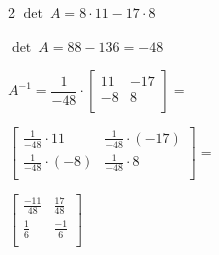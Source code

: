 \documentclass[12pt]{article}
\begin{document}
\begin{multicols}{2}
$\det~ A = 8 \cdot 11-17 \cdot 8$

$\det~ A =88-136=-48$
\vspace{0.3cm}

$A^{-1} =\dfrac{1}{-48}\cdot \begin{bmatrix}11&-17\\-8&8\\\end{bmatrix}=$
\vspace{0.3cm}

$\begin{bmatrix}\frac{1}{-48} \cdot 11&\frac{1}{-48} \cdot (-17)\\\frac{1}{-48} \cdot (-8)&\frac{1}{-48} \cdot 8\\\end{bmatrix}=$
\vspace{0.3cm}

$\begin{bmatrix}\frac{-11}{48}&\frac{17}{48}\\\frac{1}{6}&\frac{-1}{6}\\\end{bmatrix}$

\end{multicols}

\end{document}
